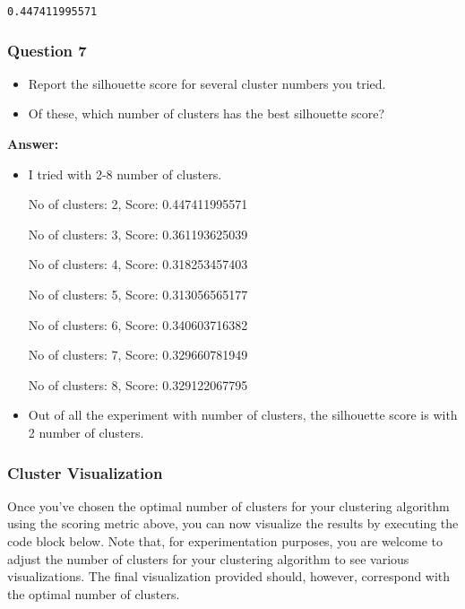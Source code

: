 \documentclass[11pt]{article}
\providecommand{\tightlist}{%
      \setlength{\itemsep}{0pt}\setlength{\parskip}{0pt}}
\begin{document}
    \begin{Verbatim}[commandchars=\\\{\}]
0.447411995571

    \end{Verbatim}

    \hypertarget{question-7}{%
\subsubsection{Question 7}\label{question-7}}

\begin{itemize}
\tightlist
\item
  Report the silhouette score for several cluster numbers you tried.
\item
  Of these, which number of clusters has the best silhouette score?
\end{itemize}

    \textbf{Answer:}

\begin{itemize}
\item
  I tried with 2-8 number of clusters.

  No of clusters: 2, Score: 0.447411995571

  No of clusters: 3, Score: 0.361193625039

  No of clusters: 4, Score: 0.318253457403

  No of clusters: 5, Score: 0.313056565177

  No of clusters: 6, Score: 0.340603716382

  No of clusters: 7, Score: 0.329660781949

  No of clusters: 8, Score: 0.329122067795
\item
  Out of all the experiment with number of clusters, the silhouette
  score is with 2 number of clusters.
\end{itemize}

    \hypertarget{cluster-visualization}{%
\subsubsection{Cluster Visualization}\label{cluster-visualization}}

Once you've chosen the optimal number of clusters for your clustering
algorithm using the scoring metric above, you can now visualize the
results by executing the code block below. Note that, for
experimentation purposes, you are welcome to adjust the number of
clusters for your clustering algorithm to see various visualizations.
The final visualization provided should, however, correspond with the
optimal number of clusters.
\end{document}
